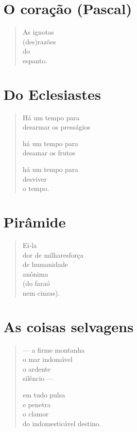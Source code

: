 \chapter{O coração (Pascal)}

\begin{verse}
As ignotas\\
(des)razões\\
do\\
espanto.
\end{verse}

\chapter{Do Eclesiastes}

\begin{verse}
Há um tempo para\\
desarmar os presságios

há um tempo para\\
desamar os frutos

há um tempo para\\
desviver\\
o tempo.
\end{verse}

\chapter{Pirâmide}

\begin{verse}
Ei-la\\
dor de milhares\qquad força\\
de humanidade\\
anônima\\
(do faraó\\
nem cinzas).
\end{verse}

\chapter{As coisas selvagens}

\begin{verse}
--- a firme montanha\\
\qquad o mar indomável\\
\qquad o ardente\\
\qquad silêncio ---

em tudo pulsa\\
e penetra\\
o clamor\\
do indomesticável destino.
\end{verse}

